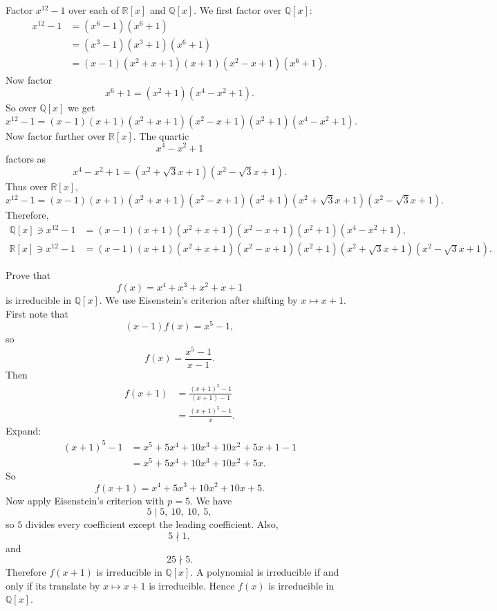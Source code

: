\begin{problem}{
    Factor $x^{12}-1$ over each of $\mathbb{R}[x]$ and $\mathbb{Q}[x]$.
}
    We first factor over $\mathbb{Q}[x]$:
    \begin{align*}
        x^{12}-1
        &=
        (x^6-1)(x^6+1)\\
        &=
        (x^3-1)(x^3+1)(x^6+1)\\
        &=
        (x-1)(x^2+x+1)(x+1)(x^2-x+1)(x^6+1).
    \end{align*}
    Now factor
    \[
        x^6+1=(x^2+1)(x^4-x^2+1).
    \]
    So over $\mathbb{Q}[x]$ we get
    \[
        x^{12}-1
        =
        (x-1)(x+1)(x^2+x+1)(x^2-x+1)(x^2+1)(x^4-x^2+1).
    \]
    Now factor further over $\mathbb{R}[x]$.
    The quartic
    \[
        x^4-x^2+1
    \]
    factors as
    \[
        x^4-x^2+1=\left(x^2+\sqrt{3}x+1\right)\left(x^2-\sqrt{3}x+1\right).
    \]
    Thus over $\mathbb{R}[x]$,
    \[
        x^{12}-1
        =
        (x-1)(x+1)(x^2+x+1)(x^2-x+1)(x^2+1)\left(x^2+\sqrt{3}x+1\right)\left(x^2-\sqrt{3}x+1\right).
    \]
    Therefore,
    \begin{align*}
        \mathbb{Q}[x]\ni x^{12}-1
        &=
        (x-1)(x+1)(x^2+x+1)(x^2-x+1)(x^2+1)(x^4-x^2+1),\\
        \mathbb{R}[x]\ni x^{12}-1
        &=
        (x-1)(x+1)(x^2+x+1)(x^2-x+1)(x^2+1)(x^2+\sqrt{3}x+1)(x^2-\sqrt{3}x+1).
    \end{align*}
\end{problem}

\begin{problem}{
    Prove that
    \[
        f(x)=x^4+x^3+x^2+x+1
    \]
    is irreducible in $\mathbb{Q}[x]$.
}
    We use Eisenstein's criterion after shifting by $x\mapsto x+1$.
    First note that
    \[
        (x-1)f(x)=x^5-1,
    \]
    so
    \[
        f(x)=\frac{x^5-1}{x-1}.
    \]
    Then
    \begin{align*}
        f(x+1)
        &=
        \frac{(x+1)^5-1}{(x+1)-1}\\
        &=
        \frac{(x+1)^5-1}{x}.
    \end{align*}
    Expand:
    \begin{align*}
        (x+1)^5-1
        &=
        x^5+5x^4+10x^3+10x^2+5x+1-1\\
        &=
        x^5+5x^4+10x^3+10x^2+5x.
    \end{align*}
    So
    \[
        f(x+1)=x^4+5x^3+10x^2+10x+5.
    \]
    Now apply Eisenstein's criterion with $p=5$.
    We have
    \[
        5\mid 5,\ 10,\ 10,\ 5,
    \]
    so $5$ divides every coefficient except the leading coefficient.
    Also,
    \[
        5\nmid 1,
    \]
    and
    \[
        25\nmid 5.
    \]
    Therefore $f(x+1)$ is irreducible in $\mathbb{Q}[x]$.
    A polynomial is irreducible if and only if its translate by $x\mapsto x+1$ is irreducible.
    Hence $f(x)$ is irreducible in $\mathbb{Q}[x]$.
\end{problem}

